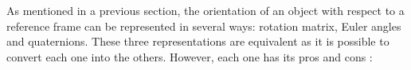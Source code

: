 As mentioned in a previous section, the orientation of an object with respect to a reference frame can be represented in several ways: rotation matrix, Euler angles and quaternions.
These three representations are equivalent as it is possible to convert each one into the others. However, each one has its pros and cons \cite{shuster_survey_1993}: 
